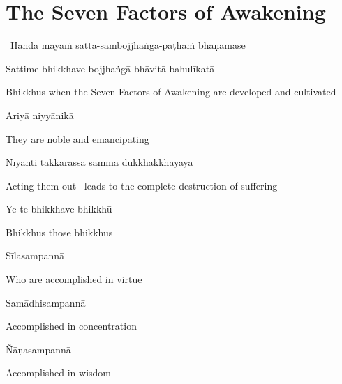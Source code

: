 \suttaRef{[DN 16]}


\section{The Seven Factors of Awakening}
\label{seven-factors-of-awakening}

\begin{leader}
  \anglebracketleft\ \hspace{-0.5mm}Handa mayaṁ satta-sambojjhaṅga-pāṭhaṁ bhaṇāmase \hspace{-0.5mm}\anglebracketright\
\end{leader}

Sattime bhikkhave bojjhaṅgā bhāvitā bahulīkatā

\begin{english-hang}
  Bhikkhus when the Seven Factors of Awakening are developed and cultivated
\end{english-hang}

Ariyā niyyānikā

\begin{english}
  They are noble and emancipating
\end{english}

Nīyanti takkarassa sammā dukkhakkhayāya

\begin{english}
  Acting them out \breathmark\ leads to the complete destruction of suffering
\end{english}

\suttaRef{[SN 46.19]}

Ye te bhikkhave bhikkhū

\begin{english}
  Bhikkhus those bhikkhus
\end{english}

Sīlasampannā

\begin{english}
  Who are accomplished in virtue
\end{english}

Samādhisampannā

\begin{english}
  Accomplished in concentration
\end{english}

Ñāṇasampannā

\begin{english}
  Accomplished in wisdom
\end{english}

